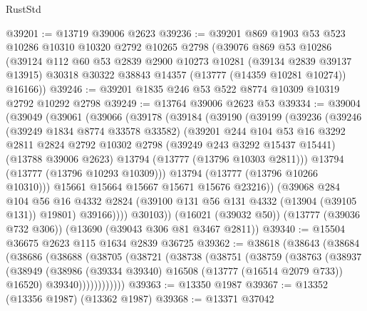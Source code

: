 \begin{lexlean}{RustStd}
\begin{coremodule}
@39201 := @13719 @39006 @2623
@39236 := @39201
    @869
    @1903
    @53
    @523
    @10286
    @10310
    @10320
    @2792
    @10265
    @2798
    (@39076
      @869
      @53
      @10286
      (@39124
        @112
        @60
        @53
        @2839
        @2900
        @10273
        @10281
        (@39134 @2839 @39137 @13915)
        @30318
        @30322
        @38843
        @14357
        (@13777 (@14359 @10281 @10274))
        @16166))
@39246 := @39201 @1835 @246 @53 @522 @8774 @10309 @10319 @2792 @10292 @2798
@39249 := @13764 @39006 @2623 @53
@39334 := @39004
    (@39049
      (@39061
        (@39066
          (@39178
            (@39184
              (@39190
                (@39199
                  (@39236
                    (@39246
                      (@39249 @1834 @8774 @33578 @33582)
                      (@39201
                        @244
                        @104
                        @53
                        @16
                        @3292
                        @2811
                        @2824
                        @2792
                        @10302
                        @2798
                        (@39249 @243 @3292 @15437 @15441)
                        (@13788 @39006 @2623)
                        @13794
                        (@13777 (@13796 @10303 @2811)))
                      @13794
                      (@13777 (@13796 @10293 @10309)))
                    @13794
                    (@13777 (@13796 @10266 @10310)))
                  @15661
                  @15664
                  @15667
                  @15671
                  @15676
                  @23216))
              (@39068
                @284
                @104
                @56
                @16
                @4332
                @2824
                (@39100 @131 @56 @131 @4332 (@13904 (@39105 @131)) @19801)
                @39166))))
        @30103))
    (@16021 (@39032 @50))
    (@13777 (@39036 @732 @306))
    (@13690 (@39043 @306 @81 @3467 @2811))
@39340 := @15504 @36675 @2623 @115 @1634 @2839 @36725
@39362 := @38618
    (@38643
      (@38684
        (@38686
          (@38688
            (@38705
              (@38721
                (@38738
                  (@38751
                    (@38759
                      (@38763
                        (@38937
                          (@38949
                            (@38986 (@39334 @39340) @16508 (@13777 (@16514 @2079 @733)) @16520)
                            @39340))))))))))))
@39363 := @13350 @1987
@39367 := @13352 (@13356 @1987) (@13362 @1987)
@39368 := @13371 @37042

\end{coremodule}
\end{lexlean}
